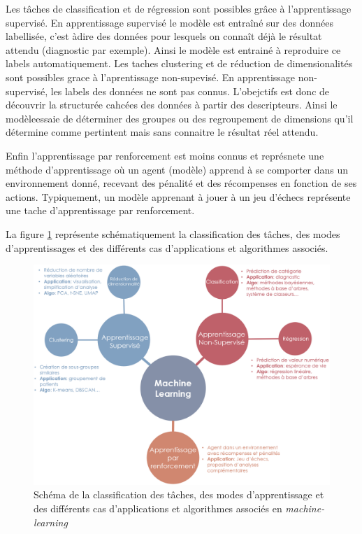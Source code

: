 Les tâches de classification et de régression sont possibles grâce à l'apprentissage supervisé. En apprentissage supervisé le modèle est entraîné sur des données labellisée, c'est àdire des données pour lesquels on connaît déjà le résultat attendu (diagnostic par exemple). Ainsi le modèle est entrainé à reproduire ce labels automatiquement.
Les taches clustering et de réduction de dimensionalités sont possibles grace à l'aprentissage non-supevisé. En apprentissage non-supervisé, les labels des données ne sont pas connus. L'obejctifs est donc de découvrir la structurée cahcées des données à partir des descripteurs. Ainsi le modèleessaie de déterminer des groupes ou des regroupement de dimensions qu'il détermine comme pertintent mais sans connaitre le résultat réel attendu.

Enfin l'apprentissage par renforcement est moins connus et représnete une méthode d'apprentissage où un agent (modèle) apprend à se comporter dans un environnement donné, recevant des pénalité et des récompenses en fonction de ses actions. Typiquement,  un modèle apprenant à jouer à un jeu d'échecs représente une tache d'apprentissage par renforcement.

La figure \ref{fig:ml-landscape} représente schématiquement la classification des tâches, des modes d'apprentissages et des différents cas d'applications et algorithmes associés.
\begin{figure}[!htbp]
 \centering
 \includegraphics[width=1\textwidth]{figures/ml_landscape.png}
 \caption[Schéma des méthodes de machine-learning]{Schéma de la classification des tâches, des modes d'apprentissage et des différents cas d'applications et algorithmes associés en \textit{machine-learning}}
 \label{fig:ml-landscape}
\end{figure}

